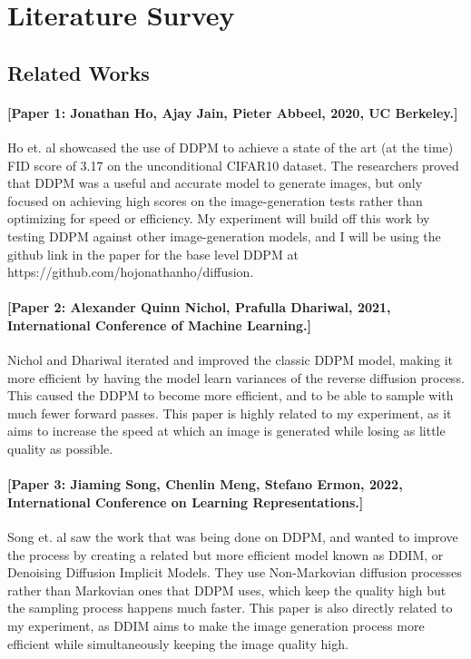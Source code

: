 \documentclass[11pt, letterpaper]{article}
\begin{document}
\section{Literature Survey}


\subsection{Related Works}

\paragraph{[Paper 1: Jonathan Ho, Ajay Jain, Pieter Abbeel, 2020, UC Berkeley.]}
Ho et. al showcased the use of DDPM to achieve a state of the art (at the time) FID score of 3.17 on the unconditional CIFAR10 dataset. The researchers proved that DDPM was a useful and accurate model to generate images, but only focused on achieving high scores on the image-generation tests rather than optimizing for speed or efficiency. My experiment will build off this work by testing DDPM against other image-generation models, and I will be using the github link in the paper for the base level DDPM at https://github.com/hojonathanho/diffusion.

\paragraph{[Paper 2: Alexander Quinn Nichol, Prafulla Dhariwal, 2021, International Conference of Machine Learning.]}
Nichol and Dhariwal iterated and improved the classic DDPM model, making it more efficient by having the model learn variances of the reverse diffusion process. This caused the DDPM to become more efficient, and to be able to sample with much fewer forward passes. This paper is highly related to my experiment, as it aims to increase the speed at which an image is generated while losing as little quality as possible. 

\paragraph{[Paper 3: Jiaming Song, Chenlin Meng, Stefano Ermon, 2022, International Conference on Learning Representations.]}
Song et. al saw the work that was being done on DDPM, and wanted to improve the process by creating a related but more efficient model known as DDIM, or Denoising Diffusion Implicit Models. They use Non-Markovian diffusion processes rather than Markovian ones that DDPM uses, which keep the quality high but the sampling process happens much faster. This paper is also directly related to my experiment, as DDIM aims to make the image generation process more efficient while simultaneously keeping the image quality high.
\end{document}

